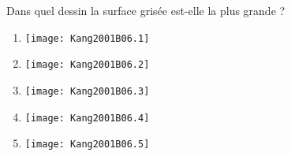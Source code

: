 Dans quel dessin la surface grisée est-elle la plus grande ?
\begin{multicols}{5}
  \begin{enumerate}[A/]
  \item \texttt{[image: Kang2001B06.1]}
  \item \texttt{[image: Kang2001B06.2]}
  \item \texttt{[image: Kang2001B06.3]}
  \item \texttt{[image: Kang2001B06.4]}
  \item \texttt{[image: Kang2001B06.5]}
  \end{enumerate}
\end{multicols}